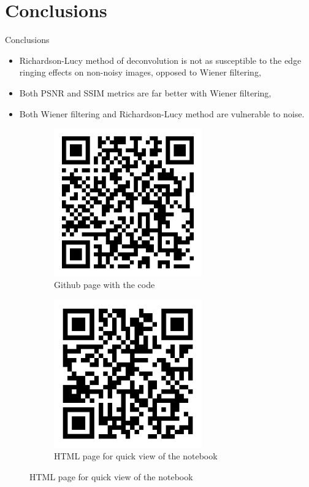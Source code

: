 \documentclass[aspectratio=1610]{beamer}
\begin{document}
\section{Conclusions}
\begin{frame}{Conclusions}
  \begin{itemize}
      \item Richardson-Lucy method of deconvolution is not as susceptible to the
      edge ringing effects on non-noisy images, opposed to Wiener filtering,
      \item Both PSNR and SSIM metrics are far better with Wiener filtering,
      \item Both Wiener filtering and Richardson-Lucy method
      are vulnerable to noise.
  \end{itemize}
  \begin{figure}
    \centering
    \begin{subfigure}[t]{0.4\textwidth}
        \includegraphics[width=0.7\textwidth]{images/github_wiener.png}
        \caption{Github page with the code}
        \label{fig:restored9}
    \end{subfigure}
    \begin{subfigure}[t]{0.4\textwidth}
        \includegraphics[width=0.7\textwidth]{images/notebook_wiener.png}
        \caption{HTML page for quick view of the notebook}
        \label{fig:restored10}
    \end{subfigure}
  \end{figure}
\end{frame}
\end{document}
